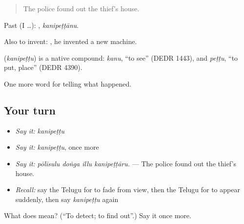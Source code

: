 \begin{quote}
The police found out the thief's house.
\end{quote}

Past (I …): , \emph{kanipeṭṭānu}.

Also to invent:    , he invented a new machine.

\begin{cousinweb}
\textbf{} (\emph{kanipeṭṭu}) is a native compound: \emph{kanu}, \textquotedblleft{}to see\textquotedblright{} (DEDR 1443), and \emph{peṭṭu}, \textquotedblleft{}to put, place\textquotedblright{} (DEDR 4390).
\end{cousinweb}

\begin{grammarlens}[title={What you've built}]
One more word for telling what happened.
\end{grammarlens}

\subsection*{Your turn}
\begin{itemize}
\raggedright
  \item \emph{Say it:} \emph{kanipeṭṭu}
  \item \emph{Say it:} \emph{kanipeṭṭu}, once more
  \item \emph{Say it:} \emph{pōlīsulu doṅga illu kanipeṭṭāru.} — The police found out the thief's house.
  \item \emph{Recall:} say the Telugu for to fade from view, then the Telugu for to appear suddenly, then say \emph{kanipeṭṭu} again
\end{itemize}

\begin{tcolorbox}[breakable,colback=teal!4,colframe=teal!35!black,title={Before you move on}]
What does  mean? (\textquotedblleft{}To detect; to find out\textquotedblright{}.) Say it once more.
\end{tcolorbox}
